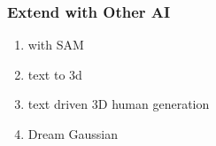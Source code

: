 \begin{frame}
    \frametitle{Extend with Other AI}
    \begin{enumerate}
        \item with SAM \cite{yeGaussianGroupingSegment2023}
        \item text to 3d \cite{vilesovCG3DCompositionalGeneration2023}
        \item text driven 3D human generation \cite{liuHumanGaussianTextDriven3D2023}
        \item Dream Gaussian \cite{tangDreamGaussianGenerativeGaussian2023}
    \end{enumerate}
\end{frame}



